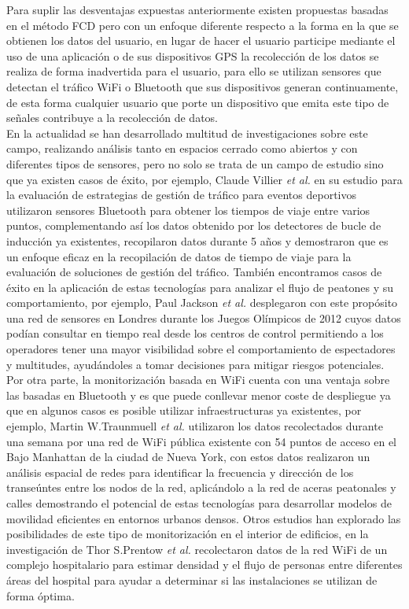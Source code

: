 \documentclass[../proyecto.tex]{subfiles}
\begin{document}
Para suplir las desventajas expuestas anteriormente existen propuestas basadas en el método FCD pero con un enfoque diferente respecto a la forma en la que se obtienen los datos del usuario, en lugar de hacer el usuario participe mediante el uso de una aplicación o de sus dispositivos GPS la recolección de los datos se realiza de forma inadvertida para el usuario, para ello se utilizan sensores que detectan el tráfico WiFi o Bluetooth que sus dispositivos generan continuamente, de esta forma cualquier usuario que porte un dispositivo que emita este tipo de señales contribuye a la recolección de datos.\\

En la actualidad se han desarrollado multitud de investigaciones sobre este campo, realizando análisis tanto en espacios cerrado como abiertos y con diferentes tipos de sensores, pero no solo se trata de un campo de estudio sino que ya existen casos de éxito, por ejemplo, Claude Villier \textit{et al.} en su estudio para la evaluación de estrategias de gestión de tráfico para eventos deportivos \cite{VILLIERS2019100052} utilizaron sensores Bluetooth para obtener los tiempos de viaje entre varios puntos, complementando así los datos obtenido por los detectores de bucle de inducción ya existentes, recopilaron datos durante 5 años y demostraron que es un enfoque eficaz en la recopilación de datos de tiempo de viaje para la evaluación de soluciones de gestión del tráfico. También encontramos casos de éxito en la aplicación de estas tecnologías para analizar el flujo de peatones y su comportamiento, por ejemplo,  Paul Jackson \textit{et al.} \cite{JACKSON2012} desplegaron con este propósito una red de sensores en Londres durante los Juegos Olímpicos de 2012 cuyos datos podían consultar en tiempo real desde los centros de control permitiendo a los operadores tener una mayor visibilidad sobre el comportamiento de espectadores y multitudes, ayudándoles a tomar decisiones para mitigar riesgos potenciales. \\

Por otra parte, la monitorización basada en WiFi cuenta con una ventaja sobre las basadas en Bluetooth y es que puede conllevar menor coste de despliegue ya que en algunos casos es posible utilizar infraestructuras ya existentes, por ejemplo, Martin W.Traunmuell \textit{et al.} \cite{TRAUNMUELLER20184} utilizaron los datos recolectados durante una semana por una red de WiFi pública existente con 54 puntos de acceso en el Bajo Manhattan de la ciudad de Nueva York, con estos datos realizaron un análisis espacial de redes para identificar la frecuencia y dirección de los transeúntes entre los nodos de la red, aplicándolo a la red de aceras peatonales y calles  demostrando el potencial de estas tecnologías para desarrollar modelos de movilidad eficientes en entornos urbanos densos. Otros estudios han explorado las posibilidades de este tipo de monitorización en el interior de edificios, en la investigación de Thor S.Prentow \textit{et al.} \cite{PRENTOW2015305} recolectaron datos de la red WiFi de un complejo hospitalario para estimar densidad y el flujo de personas entre diferentes áreas del hospital para ayudar a determinar si las instalaciones se utilizan de forma óptima.\\
\end{document}
